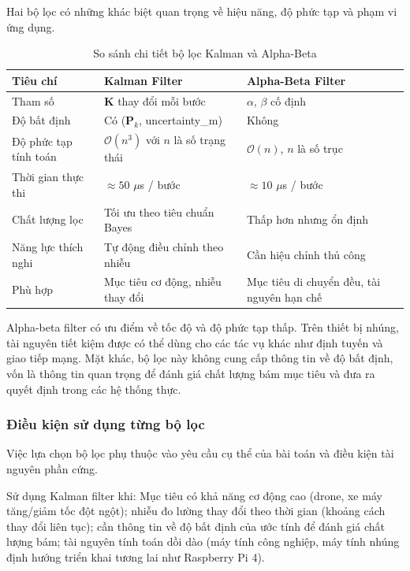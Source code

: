 \hspace{0.5cm} Hai bộ lọc có những khác biệt quan trọng về hiệu năng, độ phức tạp và phạm vi ứng dụng.

\begin{table}[H]
\centering
\caption{So sánh chi tiết bộ lọc Kalman và Alpha-Beta}
\label{tab:kf-vs-ab}
\begin{tabularx}{\linewidth}{lXX}
\toprule
\textbf{Tiêu chí} & \textbf{Kalman Filter} & \textbf{Alpha-Beta Filter} \\
\midrule
Tham số & $\mathbf{K}$ thay đổi mỗi bước & $\alpha$, $\beta$ cố định \\
Độ bất định & Có ($\mathbf{P}_k$, uncertainty\_m) & Không \\
Độ phức tạp tính toán & $\mathcal{O}(n^3)$ với $n$ là số trạng thái & $\mathcal{O}(n)$, $n$ là số trục \\
Thời gian thực thi & $\approx 50$ $\mu$s / bước & $\approx 10$ $\mu$s / bước \\
Chất lượng lọc & Tối ưu theo tiêu chuẩn Bayes & Thấp hơn nhưng ổn định \\
Năng lực thích nghi & Tự động điều chỉnh theo nhiễu & Cần hiệu chỉnh thủ công \\
Phù hợp & Mục tiêu cơ động, nhiễu thay đổi & Mục tiêu di chuyển đều, tài nguyên hạn chế \\
\bottomrule
\end{tabularx}
\end{table}

Alpha-beta filter có ưu điểm về tốc độ và độ phức tạp thấp. Trên thiết bị nhúng, tài nguyên tiết kiệm được có thể dùng cho các tác vụ khác như định tuyến và giao tiếp mạng. Mặt khác, bộ lọc này không cung cấp thông tin về độ bất định, vốn là thông tin quan trọng để đánh giá chất lượng bám mục tiêu và đưa ra quyết định trong các hệ thống thực.

\subsubsection{Điều kiện sử dụng từng bộ lọc}

\hspace{0.5cm} Việc lựa chọn bộ lọc phụ thuộc vào yêu cầu cụ thể của bài toán và điều kiện tài nguyên phần cứng.

Sử dụng Kalman filter khi: Mục tiêu có khả năng cơ động cao (drone, xe máy tăng/giảm tốc đột ngột); nhiễu đo lường thay đổi theo thời gian (khoảng cách thay đổi liên tục); cần thông tin về độ bất định của ước tính để đánh giá chất lượng bám; tài nguyên tính toán dồi dào (máy tính công nghiệp, máy tính nhúng định hướng triển khai tương lai như Raspberry Pi 4).

